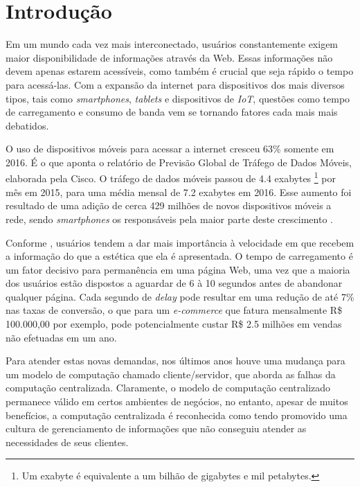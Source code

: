 \chapter[Introdução]{Introdução}

Em um mundo cada vez mais interconectado, usuários constantemente exigem maior disponibilidade de informações através da Web. Essas informações não devem apenas estarem acessíveis, como também é crucial que seja rápido o tempo para acessá-las. Com a expansão da internet para dispositivos dos mais diversos tipos, tais como \textit{smartphones}, \textit{tablets} e dispositivos de \textit{IoT}, questões como tempo de carregamento e consumo de banda vem se tornando fatores cada mais mais debatidos.

O uso de dispositivos móveis para acessar a internet cresceu 63\% somente em 2016. É o que aponta o relatório de Previsão Global de Tráfego de Dados Móveis, elaborada pela Cisco. O tráfego de dados móveis passou de  4.4 exabytes \footnote{Um exabyte é equivalente a um bilhão de gigabytes e mil petabytes.} por mês em 2015, para uma média mensal de 7.2 exabytes em 2016. Esse aumento foi resultado de uma adição de cerca 429 milhões de novos dispositivos móveis a rede, sendo \textit{smartphones} os responsáveis pela maior parte deste crescimento \cite{cisco-network-report}.

Conforme , usuários tendem a dar mais importância à velocidade em que recebem a informação do que a estética que ela é apresentada. O tempo de carregamento é um fator decisivo para permanência em uma página Web, uma vez que a maioria dos usuários estão dispostos a aguardar de 6 à 10 segundos antes de abandonar qualquer página. Cada segundo de \textit{delay} pode resultar em uma redução de até 7\% nas taxas de conversão, o que para um \textit{e-commerce} que fatura mensalmente R\$ 100.000,00 por exemplo, pode potencialmente custar R\$ 2.5 milhões em vendas não efetuadas em um ano.

Para atender estas novas demandas, nos últimos anos houve uma mudança para um modelo de computação chamado cliente/servidor, que aborda as falhas da computação centralizada. Claramente, o modelo de computação centralizado permanece válido em certos ambientes de negócios, no entanto, apesar de muitos benefícios, a computação centralizada é reconhecida como tendo promovido uma cultura de gerenciamento de informações que não conseguiu atender as necessidades de seus clientes.

